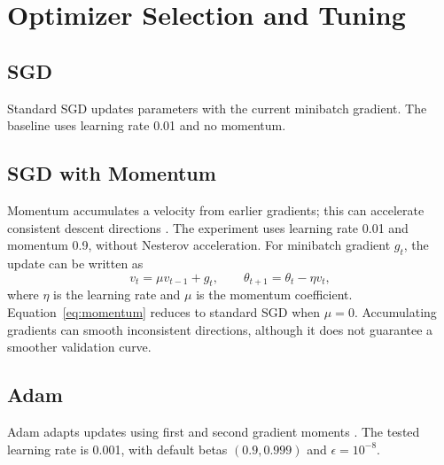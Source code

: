 \section{Optimizer Selection and Tuning}
\subsection{SGD}
Standard SGD updates parameters with the current minibatch gradient. The
baseline uses learning rate 0.01 and no momentum.
\subsection{SGD with Momentum}
Momentum accumulates a velocity from earlier gradients; this can accelerate
consistent descent directions \cite{sutskever2013}. The experiment uses
learning rate 0.01 and momentum 0.9, without Nesterov acceleration.
For minibatch gradient $g_t$, the update can be written as
\begin{equation}
v_t=\mu v_{t-1}+g_t,\qquad
\theta_{t+1}=\theta_t-\eta v_t,
\label{eq:momentum}
\end{equation}
where $\eta$ is the learning rate and $\mu$ is the momentum coefficient.
Equation~\eqref{eq:momentum} reduces to standard SGD when $\mu=0$.
Accumulating gradients can smooth inconsistent directions, although it does
not guarantee a smoother validation curve.
\subsection{Adam}
Adam adapts updates using first and second gradient moments \cite{kingma2015}.
The tested learning rate is 0.001, with default betas $(0.9,0.999)$ and
$\epsilon=10^{-8}$.
